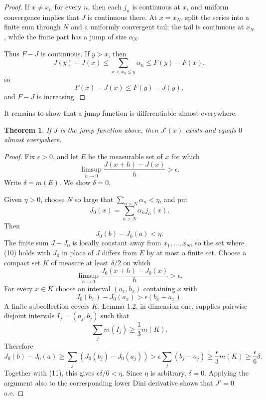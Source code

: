 \documentclass[11pt,openany]{book}
\newtheorem{theorem}{Theorem}[section]
\begin{document}
\begin{proof}
If $x\ne x_n$ for every $n$, then each $j_n$ is continuous at $x$, and uniform convergence implies that $J$ is continuous there. At $x=x_N$, split the series into a finite sum through $N$ and a uniformly convergent tail; the tail is continuous at $x_N$, while the finite part has a jump of size $\alpha_N$.

Thus $F-J$ is continuous. If $y>x$, then
\[
J(y)-J(x)\le\sum_{x<x_n\le y}\alpha_n\le F(y)-F(x),
\]
so
\[
F(x)-J(x)\le F(y)-J(y),
\]
and $F-J$ is increasing.
\end{proof}

It remains to show that a jump function is differentiable almost everywhere.

\begin{theorem}
If $J$ is the jump function above, then $J'(x)$ exists and equals $0$ almost everywhere.
\end{theorem}

\begin{proof}
Fix $\epsilon>0$, and let $E$ be the measurable set of $x$ for which
\begin{equation}
\limsup_{h\to0}\frac{J(x+h)-J(x)}{h}>\epsilon.
\tag{10}
\end{equation}
Write $\delta=m(E)$. We show $\delta=0$.

Given $\eta>0$, choose $N$ so large that $\sum_{n>N}\alpha_n<\eta$, and put
\[
J_0(x)=\sum_{n>N}\alpha_nj_n(x).
\]
Then
\begin{equation}
J_0(b)-J_0(a)<\eta.
\tag{11}
\end{equation}
The finite sum $J-J_0$ is locally constant away from $x_1,\ldots,x_N$, so the set where (10) holds with $J_0$ in place of $J$ differs from $E$ by at most a finite set. Choose a compact set $K$ of measure at least $\delta/2$ on which
\[
\limsup_{h\to0}\frac{J_0(x+h)-J_0(x)}{h}>\epsilon.
\]
For every $x\in K$ choose an interval $(a_x,b_x)$ containing $x$ with
\[
J_0(b_x)-J_0(a_x)>\epsilon(b_x-a_x).
\]
A finite subcollection covers $K$. Lemma 1.2, in dimension one, supplies pairwise disjoint intervals $I_j=(a_j,b_j)$ such that
\[
\sum_jm(I_j)\ge\frac13m(K).
\]
Therefore
\[
J_0(b)-J_0(a)
\ge\sum_j(J_0(b_j)-J_0(a_j))
>\epsilon\sum_j(b_j-a_j)
\ge\frac\epsilon3m(K)
\ge\frac\epsilon6\delta.
\]
Together with (11), this gives $\epsilon\delta/6<\eta$. Since $\eta$ is arbitrary, $\delta=0$. Applying the argument also to the corresponding lower Dini derivative shows that $J'=0$ a.e.
\end{proof}
\end{document}

